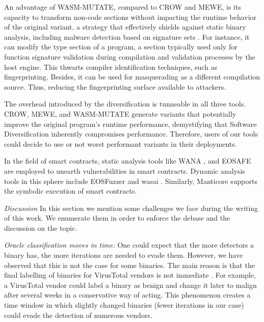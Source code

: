 An advantage of WASM-MUTATE, compared to CROW and MEWE, is its capacity to transform non-code sections without impacting the runtime behavior of the original variant, a strategy that effectively shields against static binary analysis, including malware detection based on signature sets \cite{EVASION}.
For instance, it can modify the type section of a \Wasm program, a section typically used only for function signature validation during compilation and validation processes by the host engine. 
This thwarts compiler identification techniques, such as fingerprinting.
Besides, it can be used for masquerading as a different compilation source.
Thus, reducing the fingerprinting surface available to attackers.


The overhead introduced by the diversification is tunneable in all three tools.
CROW, MEWE, and WASM-MUTATE generate variants that potentially improve the original program's runtime performance, demystifying that Software Diversification inherently compromises performance.
Therefore, users of our tools could decide to use or not worst performant variants in their deployments.


 In the field of smart contracts, static analysis tools like WANA \cite{wana}, and EOSAFE \cite{eosafe} are employed to unearth vulnerabilities in \Wasm smart contracts. 
Dynamic analysis tools in this sphere include EOSFuzzer \cite{EOSFuzzer} and wasai \cite{wasai}.
Similarly, Manticore supports the symbolic execution of \wasm smart contracts. 


\emph{Discussion}
In this section we mention some challenges we face during the writing of this work.
We enumerate them in order to enforce the debase and the discussion on the topic.

\emph{Oracle classification moves in time:}
One could expect that the more detectors a binary has, the more iterations are needed to evade them.
However, we have observed that this is not the case for some binaries.
The main reason is that the final labelling of binaries for VirusTotal vendors is not immediate \cite{251586}. 
For example, a VirusTotal vendor could label a binary as benign and change it later to malign after several weeks in a conservative way of acting.
This phenomenon creates a time window in which slightly changed binaries (fewer iterations in our case) could evade the detection of numerous vendors.

